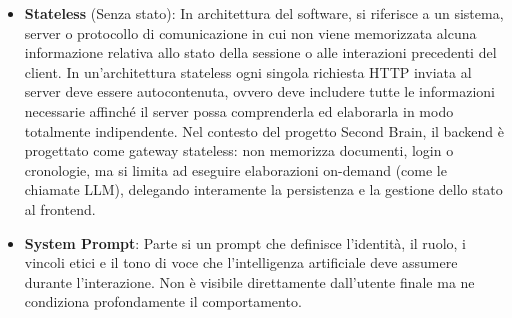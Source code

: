 \documentclass[11pt,a4paper]{article}
\begin{document}
\begin{itemize}
\item \textbf{Stateless} (Senza stato): In architettura del software, si riferisce a un sistema, server o protocollo di comunicazione in cui non viene memorizzata alcuna informazione relativa allo stato della sessione o alle interazioni precedenti del client. In un'architettura stateless ogni singola richiesta HTTP inviata al server deve essere autocontenuta, ovvero deve includere tutte le informazioni necessarie affinché il server possa comprenderla ed elaborarla in modo totalmente indipendente. Nel contesto del progetto Second Brain, il backend è progettato come gateway stateless: non memorizza documenti, login o cronologie, ma si limita ad eseguire elaborazioni on-demand (come le chiamate LLM), delegando interamente la persistenza e la gestione dello stato al frontend.

\item \textbf{System Prompt}: Parte si un prompt che definisce l'identità, il ruolo, i vincoli etici e il tono di voce che l'intelligenza artificiale deve assumere durante l'interazione. Non è visibile direttamente dall'utente finale ma ne condiziona profondamente il comportamento.
\end{itemize}

\newpage
\end{document}
